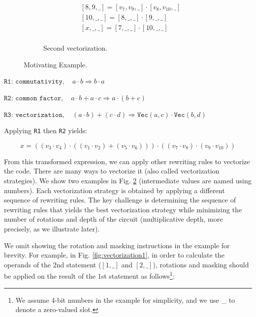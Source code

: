 \begin{figure}[h!t]
\begin{subfigure}{0.22\textwidth}
\begin{minipage}{\linewidth}
\[\begin{aligned}
              & [8 , 9 , \_] = [v_7 , v_9 , \_] \cdot [v_8, v_{10} , \_] \\
              & [10 , \_ , \_] = [8 , \_ , \_] \cdot [9 , \_ , \_] \\
              & [x , \_ , \_] = [7 , \_ , \_] \cdot [10 , \_ , \_] \\
            \end{aligned}
            \]
        \end{minipage}
        \caption{Second vectorization.}
        \label{fig:vectorization2}
    \end{subfigure}
    \vspace{-0.3cm}
    \caption{Motivating Example.}
    \label{fig:vectorization}
    \shrink[2]
\end{figure}

{
\vspace{0.25cm}
\CodeSize
\(
\texttt{R1: commutativity},\quad a \cdot b \Rightarrow b \cdot a 
\)

\(
\texttt{R2: common factor},\quad a \cdot b + a \cdot c \Rightarrow a \cdot (b + c)
\)

\(
\texttt{R3: vectorization},\quad (a \cdot b) + (c \cdot d) \Rightarrow \texttt{Vec}(a , c) \cdot \texttt{Vec}(b , d)
\)
\vspace{0.25cm}
}

Applying \texttt{R1} then \texttt{R2} yields:

{
\shrink[1.5]
\CodeSize
\begin{equation}
x = (  ( v_3 \cdot v_4) \cdot ((v_1 \cdot v_2) + (v_5 \cdot v_6))) \cdot ((v_7 \cdot v_8) \cdot (v_9 \cdot v_{10}))
\label{eq:vectorization-alt}
\tag{2}
\end{equation}
}


From this transformed expression, we can apply other rewriting rules to vectorize the code. There are many ways to vectorize it (also called vectorization strategies). We show two examples in Fig. \ref{fig:vectorization} (intermediate values are named using numbers). Each vectorization strategy is obtained by applying a different sequence of rewriting rules. 
The key challenge is determining the sequence of rewriting rules that yields the best vectorization strategy while minimizing the number of rotations and depth of the circuit (multiplicative depth, more precisely, as we illustrate later).

We omit showing the rotation and masking instructions in the example for brevity. For example, in Fig. \ref{fig:vectorization1}, in order to calculate the operands of the 2nd statement ($[1,\_]$ and $[2,\_]$), rotations and masking should be applied on the result of the 1st statement as follows\footnote{We assume 4-bit numbers in the example for simplicity, and we use \_ to denote a zero-valued slot.}:



